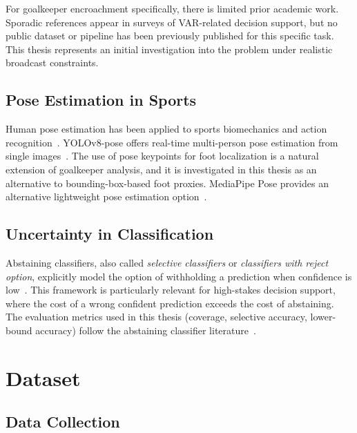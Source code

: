 \documentclass[12pt,a4paper,twoside]{article}
\begin{document}
For goalkeeper encroachment specifically, there is limited prior academic work.
Sporadic references appear in surveys of VAR-related decision support, but no
public dataset or pipeline has been previously published for this specific task.
This thesis represents an initial investigation into the problem under realistic
broadcast constraints.

\subsection{Pose Estimation in Sports}

Human pose estimation has been applied to sports biomechanics and action
recognition~\cite{bridgeman2019multi}. YOLOv8-pose offers real-time
multi-person pose estimation from single images~\cite{ultralytics2023}.
The use of pose keypoints for foot localization is a natural extension of
goalkeeper analysis, and it is investigated in this thesis as an alternative
to bounding-box-based foot proxies. MediaPipe Pose provides an alternative
lightweight pose estimation
option~\cite{lugaresi2019mediapipe}.

\subsection{Uncertainty in Classification}

Abstaining classifiers, also called \textit{selective classifiers} or
\textit{classifiers with reject option}, explicitly model the option of
withholding a prediction when confidence is low~\cite{bartlett2008classification}.
This framework is particularly relevant for high-stakes decision support,
where the cost of a wrong confident prediction exceeds the cost of abstaining.
The evaluation metrics used in this thesis (coverage, selective accuracy,
lower-bound accuracy) follow the abstaining classifier
literature~\cite{geifman2017selective}.


\section{Dataset}
\label{sec:dataset}

\subsection{Data Collection}
\end{document}
